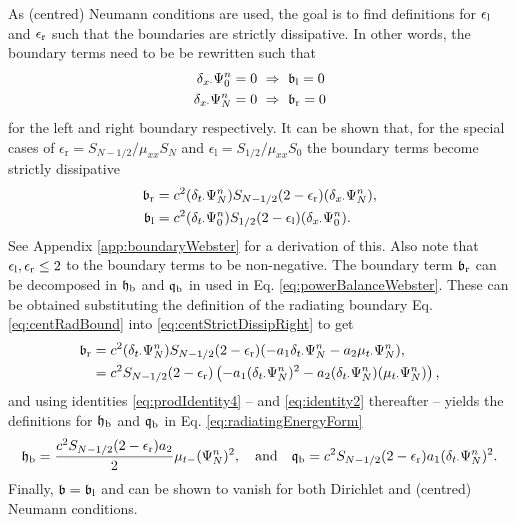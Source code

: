 {As (centred) Neumann conditions are used, the goal is to find definitions for $\epsilon_\text{l}$ and $\epsilon_\text{r}$ such that the boundaries are strictly dissipative. In other words, the boundary terms need to be be rewritten such that 
\begin{align*}
    \delta_{x\cdot} \Psi_0^n &= 0\  \Rightarrow\ \mathfrak{b}_\text{l} = 0 \\
    \delta_{x\cdot} \Psi_N^n &= 0\  \Rightarrow\ \mathfrak{b}_\text{r} = 0
\end{align*} 
for the left and right boundary respectively. It can be shown that, for the special cases of $\epsilon_\text{r} = S_{N-1/2}/\mu_{xx}S_N$ and $\epsilon_\text{l} = S_{1/2}/\mu_{xx}S_0$ the boundary terms become strictly dissipative
\begin{subequations}\label{eq:centStrictDissip}
\begin{align}
    \mathfrak{b}_\text{r} &= c^2 (\delta_{t\cdot}\Psi_N^n)S_{N-1/2}(2-\epsilon_\text{r})(\delta_{x\cdot}\Psi_N^n)\label{eq:centStrictDissipRight},\\
    \mathfrak{b}_\text{l} &= c^2 (\delta_{t\cdot}\Psi_0^n)S_{1/2}(2-\epsilon_\text{l})(\delta_{x\cdot}\Psi_0^n).\label{eq:centStrictDissipLeft}
\end{align}
\end{subequations}
See Appendix \ref{app:boundaryWebster} for a derivation of this. Also note that $\epsilon_\text{l}, \epsilon_\text{r} \leq 2$ to the boundary terms to be non-negative. The boundary term $\mathfrak{b}_\text{r}$ can be decomposed in $\mathfrak{h}_\text{b}$ and $\mathfrak{q}_\text{b}$ in used in Eq. \eqref{eq:powerBalanceWebster}. These can be obtained substituting the definition of the radiating boundary Eq. \eqref{eq:centRadBound} into \eqref{eq:centStrictDissipRight} to get
\begin{align*}
    \mathfrak{b}_\text{r} &= c^2 (\delta_{t\cdot}\Psi_N^n)S_{N-1/2}(2-\epsilon_\text{r})(-a_1\delta_{t\cdot}\Psi_N^n - a_2\mu_{t\cdot}\Psi_N^n),\\
    &= c^2 S_{N-1/2}(2-\epsilon_\text{r})\left(-a_1(\delta_{t\cdot}\Psi_N^n)^2 - a_2(\delta_{t\cdot}\Psi_N^n)(\mu_{t\cdot}\Psi_N^n)\right),
\end{align*}
and using identities \eqref{eq:prodIdentity4} -- and \eqref{eq:identity2} thereafter -- yields the definitions for $\mathfrak{h}_\text{b}$ and $\mathfrak{q}_\text{b}$ in Eq. \eqref{eq:radiatingEnergyForm}
\begin{equation}
    \mathfrak{h}_\text{b} = \frac{c^2 S_{N-1/2}(2-\epsilon_\text{r}) a_2}{2} \mu_{t-}(\Psi_N^n)^2, \quad \text{and} \quad \mathfrak{q}_\text{b} = c^2 S_{N-1/2}(2-\epsilon_\text{r})a_1(\delta_{t\cdot}\Psi_N^n)^2.
\end{equation}
Finally, $\mathfrak{b} = \mathfrak{b}_\text{l}$ and can be shown to vanish for both Dirichlet and (centred) Neumann conditions.

}
